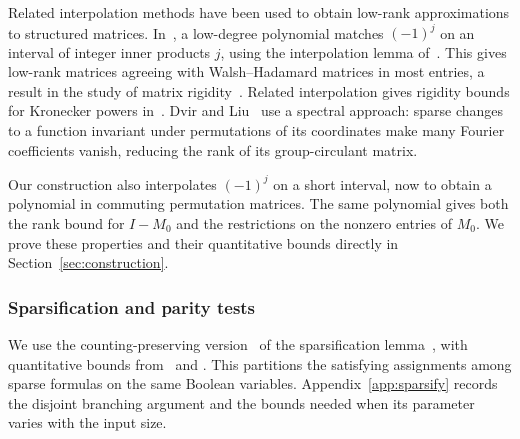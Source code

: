 \documentclass[11pt,reqno]{amsart}
\numberwithin{equation}{section}
\theoremstyle{definition}\newtheorem{definition}[theorem]{Definition}
\theoremstyle{remark}\newtheorem{remark}[theorem]{Remark}
\begin{document}
Related interpolation methods have been used to obtain low-rank
approximations to structured matrices. In~\cite[Section~3]{AW17},
a low-degree polynomial matches $(-1)^j$ on an interval of integer
inner products $j$, using the interpolation lemma
of~\cite[Lemma~3.1]{AW15}. This gives low-rank matrices agreeing with
Walsh--Hadamard matrices in most entries, a result in the study of
matrix rigidity~\cite{Val77}. Related interpolation gives rigidity
bounds for Kronecker powers in~\cite[Theorem~6.1]{AGP23}.
Dvir and Liu~\cite[Claim~2.20 and Lemmas~3.3--3.4]{DL20} use a spectral approach:
sparse changes to a function invariant under permutations of its coordinates make many Fourier coefficients vanish,
reducing the rank of its group-circulant matrix.

Our construction also interpolates $(-1)^j$ on a short interval, now
to obtain a polynomial in commuting permutation matrices. The same
polynomial gives both the rank bound for $I-M_0$ and the restrictions
on the nonzero entries of $M_0$. We prove these properties and their
quantitative bounds directly in Section~\ref{sec:construction}.

\subsubsection{Sparsification and parity tests}\label{subsec:related-reductions}
We use the counting-preserving version~\cite[Appendix~A]{DHMTW} of
the sparsification lemma~\cite{IPZ}, with quantitative bounds
from~\cite[Section~6]{CIP} and
\cite[Lemma~5.14 and equation~(5.4)]{CalabroThesis}.
This partitions the satisfying assignments among sparse formulas on
the same Boolean variables. Appendix~\ref{app:sparsify} records the
disjoint branching argument and the bounds needed when its parameter
varies with the input size.
\end{document}
